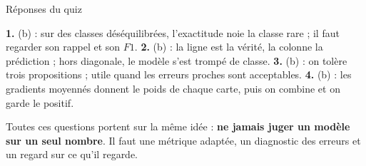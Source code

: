 \begin{frame}{Réponses du quiz}
\begin{solbox}
\textbf{1.} (b) : sur des classes déséquilibrées, l'exactitude noie la classe rare ;
il faut regarder son rappel et son $F1$. \quad
\textbf{2.} (b) : la ligne est la vérité, la colonne la prédiction ; hors diagonale,
le modèle s'est trompé de classe. \quad
\textbf{3.} (b) : on tolère trois propositions ; utile quand les erreurs proches sont
acceptables. \quad
\textbf{4.} (b) : les gradients moyennés donnent le poids de chaque carte, puis on
combine et on garde le positif.
\end{solbox}
\vspace{1mm}
\begin{wbox}
Toutes ces questions portent sur la même idée : \textbf{ne jamais juger un modèle
sur un seul nombre}. Il faut une métrique adaptée, un diagnostic des erreurs et
un regard sur ce qu'il regarde.
\end{wbox}
\end{frame}

